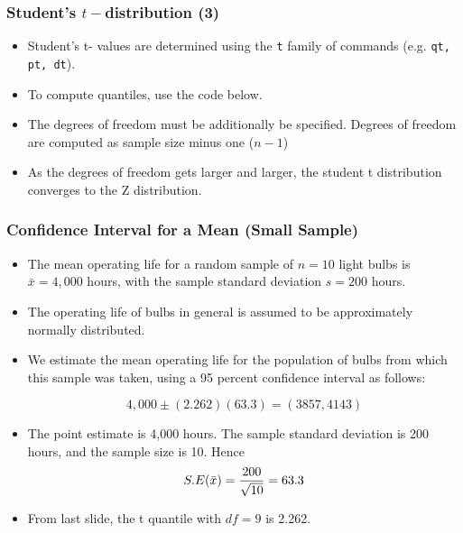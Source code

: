 \documentclass[a4]{beamer}
\begin{document}

\begin{frame}[fragile]
\frametitle{Student's $t-$distribution (3)}

\begin{itemize}
\item Student's t- values are determined using the \texttt{t} family of commands (e.g. \texttt{qt, pt, dt}).
\item To compute quantiles, use the code below.
\item The degrees of freedom must be additionally be specified. Degrees of freedom are computed as sample size minus one ($n-1$)
\item As the degrees of freedom gets larger and larger, the student t distribution converges to the Z distribution.

\end{itemize}

\end{frame}
\begin{frame}
\frametitle{Confidence Interval for a Mean (Small Sample)}
\begin{itemize}
\item The mean operating life for a random sample of $n = 10$ light bulbs is $\bar{x} = 4,000$ hours, with the sample
standard deviation $s = 200$ hours. \item The operating life of bulbs in general is assumed to be approximately normally distributed.\item
We estimate the mean operating life for the population of bulbs from which this sample was taken, using a 95 percent
confidence interval as follows:

\[4,000\pm(2.262)(63.3)  = (3857,4143)\]

\item The point estimate is 4,000 hours. The sample standard deviation is 200 hours, and the sample size is 10. Hence \[S.E(\bar{x} ) = { 200 \over \sqrt{10}} = 63.3\]

\item From last slide, the t quantile with $df=9$ is 2.262.
\end{itemize}
\end{frame}

\end{document}

